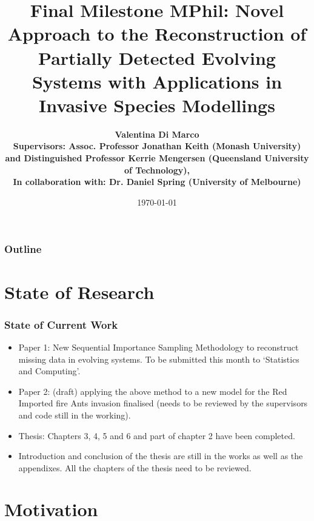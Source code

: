 \documentclass[9pt, xcolor={dvipsnames,svgnames,table}]{beamer}
\title{Final Milestone MPhil: Novel Approach to the Reconstruction of Partially Detected Evolving Systems with Applications in Invasive Species Modellings}
\author[Valentina Di Marco]{\textbf {Valentina Di Marco\\ \footnotesize Supervisors: Assoc. Professor Jonathan Keith (Monash University) and Distinguished Professor Kerrie Mengersen (Queensland University of Technology), \\ \footnotesize In collaboration with: Dr. Daniel Spring (University of Melbourne)}}
\date{\today}
\begin{document}
\begin{frame}
    \titlepage
\end{frame}

\begin{frame}
    \frametitle{Outline}
    \tableofcontents
\end{frame}






\section{State of Research}

\begin{frame}
\frametitle{State of Current Work}
    \begin{itemize}
    \setlength\itemsep{1em}
        \item Paper 1: New Sequential Importance Sampling Methodology to reconstruct missing data in evolving systems. To be submitted this month to `Statistics and Computing'.
        \item Paper 2: (draft) applying the above method to a new model for the Red Imported fire Ants invasion finalised (needs to be reviewed by the supervisors and code still in the working).
        \item Thesis: Chapters 3, 4, 5 and 6 and part of chapter 2 have been completed.
        \item Introduction and conclusion of the thesis are still in the works as well as the appendixes. All the chapters of the thesis need to be reviewed.
    \end{itemize}
\end{frame}





\section{Motivation}
\end{document}
